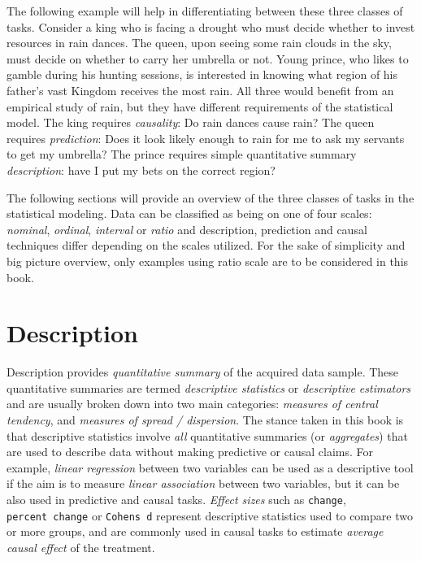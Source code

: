 \documentclass[
]{book}
\begin{document}
The following example will help in differentiating between these three classes of tasks. Consider a king who is facing a drought who must decide whether to invest resources in rain dances. The queen, upon seeing some rain clouds in the sky, must decide on whether to carry her umbrella or not. Young prince, who likes to gamble during his hunting sessions, is interested in knowing what region of his father's vast Kingdom receives the most rain. All three would benefit from an empirical study of rain, but they have different requirements of the statistical model. The king requires \emph{causality}: Do rain dances cause rain? The queen requires \emph{prediction}: Does it look likely enough to rain for me to ask my servants to get my umbrella? The prince requires simple quantitative summary \emph{description}: have I put my bets on the correct region?

The following sections will provide an overview of the three classes of tasks in the statistical modeling. Data can be classified as being on one of four scales: \emph{nominal}, \emph{ordinal}, \emph{interval} or \emph{ratio} and description, prediction and causal techniques differ depending on the scales utilized. For the sake of simplicity and big picture overview, only examples using ratio scale are to be considered in this book.

\hypertarget{description}{%
\chapter{Description}\label{description}}

Description provides \emph{quantitative summary} of the acquired data sample. These quantitative summaries are termed \emph{descriptive statistics} or \emph{descriptive estimators} and are usually broken down into two main categories: \emph{measures of central tendency}, and \emph{measures of spread / dispersion}. The stance taken in this book is that descriptive statistics involve \emph{all} quantitative summaries (or \emph{aggregates}) that are used to describe data without making predictive or causal claims. For example, \emph{linear regression} between two variables can be used as a descriptive tool if the aim is to measure \emph{linear association} between two variables, but it can be also used in predictive and causal tasks. \emph{Effect sizes} such as \texttt{change}, \texttt{percent\ change} or \texttt{Cohen\textquotesingle{}s\ d} represent descriptive statistics used to compare two or more groups, and are commonly used in causal tasks to estimate \emph{average causal effect} of the treatment.
\end{document}
